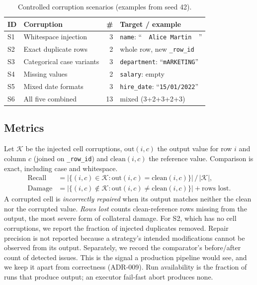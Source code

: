 \begin{table}[t]
\centering
\caption{Controlled corruption scenarios (examples from seed 42).}
\label{tab:scenarios}
\scriptsize
\begin{tabular}{@{}llrl@{}}
\toprule
\textbf{ID} & \textbf{Corruption} & \textbf{\#} & \textbf{Target / example}\\
\midrule
S1 & Whitespace injection & 3 & \texttt{name}: ``\verb*|  Alice Martin  |''\\
S2 & Exact duplicate rows & 2 & whole row, new \texttt{\_row\_id}\\
S3 & Categorical case variants & 3 & \texttt{department}: ``\texttt{mARKETING}''\\
S4 & Missing values & 2 & \texttt{salary}: empty\\
S5 & Mixed date formats & 3 & \texttt{hire\_date}: ``\texttt{15/01/2022}''\\
S6 & All five combined & 13 & mixed (3+2+3+2+3)\\
\bottomrule
\end{tabular}
\end{table}

\subsection{Metrics}
Let $\mathcal{K}$ be the injected cell corruptions, $\mathrm{out}(i,c)$ the output value for row $i$ and column $c$ (joined on \texttt{\_row\_id}) and $\mathrm{clean}(i,c)$ the reference value. Comparison is exact, including case and whitespace.
\begin{align}
\text{Recall} &= |\{(i,c)\in\mathcal{K}:\mathrm{out}(i,c)=\mathrm{clean}(i,c)\}|\,/\,|\mathcal{K}|,\\
\text{Damage} &= |\{(i,c)\notin\mathcal{K}:\mathrm{out}(i,c)\neq\mathrm{clean}(i,c)\}| + \text{rows lost}.
\end{align}
A corrupted cell is \emph{incorrectly repaired} when its output matches neither the clean nor the corrupted value. \emph{Rows lost} counts clean-reference rows missing from the output, the most severe form of collateral damage. For S2, which has no cell corruptions, we report the fraction of injected duplicates removed. Repair precision is not reported because a strategy's intended modifications cannot be observed from its output. Separately, we record the comparator's before/after count of detected issues. This is the signal a production pipeline would see, and we keep it apart from correctness (ADR-009). Run availability is the fraction of runs that produce output; an executor fail-fast abort produces none.

